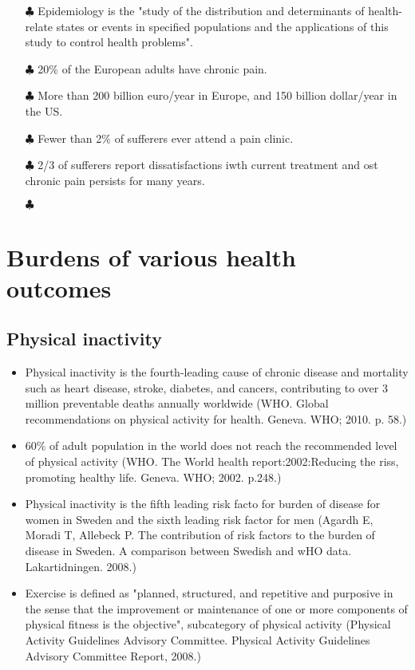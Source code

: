 \documentclass{article}
\begin{document}
\begin{itemize}
\begin{description}
				\begin{itemize}
					\item[$\clubsuit$] Epidemiology is the "study of the distribution and determinants of health-relate states or events in specified populations and the applications of this study to control health problems".
					\item[$\clubsuit$] 20\% of the European adults have chronic pain.
					\item[$\clubsuit$] More than 200 billion euro/year in Europe, and 150 billion dollar/year in the US.
					\item[$\clubsuit$] Fewer than 2\% of sufferers ever attend a pain clinic. 
					\item[$\clubsuit$] 2/3 of sufferers report dissatisfactions iwth current treatment and ost chronic pain persists for many years.
					\item[$\clubsuit$] 
				\end{itemize}
		\end{description}

\end{itemize}


\section{Burdens of various health outcomes}
\subsection{Physical inactivity}
\begin{itemize}
	\item Physical inactivity is the fourth-leading cause of chronic disease and mortality such as heart disease, stroke, diabetes, and cancers, contributing to over 3 million preventable deaths annually worldwide (WHO. Global recommendations on physical activity for health. Geneva. WHO; 2010. p. 58.)
	\item 60\% of adult population in the world does not reach the recommended level of physical activity (WHO. The World health report:2002:Reducing the riss, promoting healthy life. Geneva. WHO; 2002. p.248.)
	\item Physical inactivity is the fifth leading risk facto for burden of disease for women in Sweden and the sixth leading risk factor for men (Agardh E, Moradi T, Allebeck P. The contribution of risk factors to the burden of disease in Sweden. A comparison between Swedish and wHO data. Lakartidningen. 2008.)
	\item Exercise is defined as "planned, structured, and repetitive and purposive in the sense that the improvement or maintenance of one or more components of physical fitness is the objective", subcategory of physical activity (Physical Activity Guidelines Advisory Committee. Physical Activity Guidelines Advisory Committee Report, 2008.)
\end{itemize}
\end{document}

